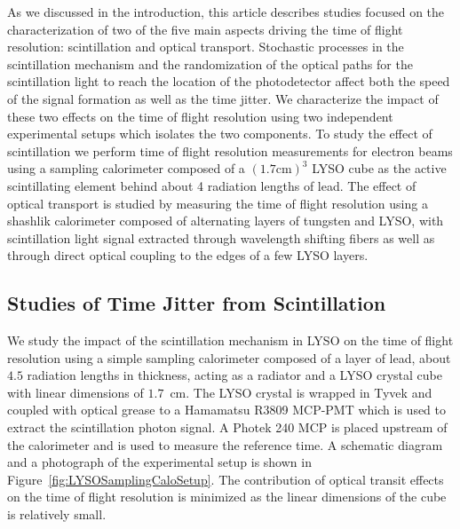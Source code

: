 \documentclass[11pt]{article}
\begin{document}
As we discussed in the introduction, this article describes studies
focused on the characterization of two of the five main aspects
driving the time of flight resolution: scintillation and 
optical transport. Stochastic processes in the scintillation
mechanism and the randomization of the optical paths for the 
scintillation light to reach the location of the photodetector 
affect both the speed of the signal formation
as well as the time jitter. We characterize the impact of
these two effects on the time of flight resolution using
two independent experimental setups which isolates the
two components. To study the effect of scintillation
we perform time of flight resolution measurements
for electron beams using a sampling calorimeter composed of a 
$(1.7\mathrm{ cm})^{3}$ LYSO cube as the active 
scintillating element behind about 4 radiation lengths of lead. 
The effect of optical transport is studied by measuring
the time of flight resolution using a shashlik 
calorimeter composed of alternating layers of tungsten
and LYSO, with scintillation light signal extracted
through wavelength shifting fibers as well as 
through direct optical coupling to the edges of a few
LYSO layers. 


\subsection{Studies of Time Jitter from Scintillation}

We study the impact of the scintillation mechanism in LYSO
on the time of flight resolution using a simple 
sampling calorimeter composed of a layer of
lead, about $4.5$ radiation lengths in thickness, acting
as a radiator and a LYSO crystal cube with linear dimensions 
of $1.7$~cm. The LYSO crystal is wrapped in Tyvek and  
coupled with optical grease to a Hamamatsu R3809 MCP-PMT
which is used to extract the scintillation photon signal. 
A Photek 240 MCP is placed upstream of the calorimeter and 
is used to measure the reference time. A schematic diagram
and a photograph of the experimental setup
is shown in Figure~\ref{fig:LYSOSamplingCaloSetup}. 
The contribution of optical transit effects on the 
time of flight resolution is minimized as the linear
dimensions of the cube is relatively small.
\end{document}
